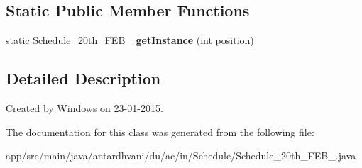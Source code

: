 \subsection*{Static Public Member Functions}
\begin{DoxyCompactItemize}
\item 
\hypertarget{classantardhvani_1_1du_1_1ac_1_1in_1_1_schedule_1_1_schedule__20th___f_e_b__2015_adeea59dab409353c31098dc9970c7dcb}{}static \hyperlink{classantardhvani_1_1du_1_1ac_1_1in_1_1_schedule_1_1_schedule__20th___f_e_b__2015}{Schedule\+\_\+20th\+\_\+\+F\+E\+B\+\_} {\bfseries get\+Instance} (int position)\label{classantardhvani_1_1du_1_1ac_1_1in_1_1_schedule_1_1_schedule__20th___f_e_b__2015_adeea59dab409353c31098dc9970c7dcb}

\end{DoxyCompactItemize}


\subsection{Detailed Description}
Created by Windows on 23-\/01-\/2015. 

The documentation for this class was generated from the following file\+:\begin{DoxyCompactItemize}
\item 
app/src/main/java/antardhvani/du/ac/in/\+Schedule/Schedule\+\_\+20th\+\_\+\+F\+E\+B\+\_.\+java\end{DoxyCompactItemize}
